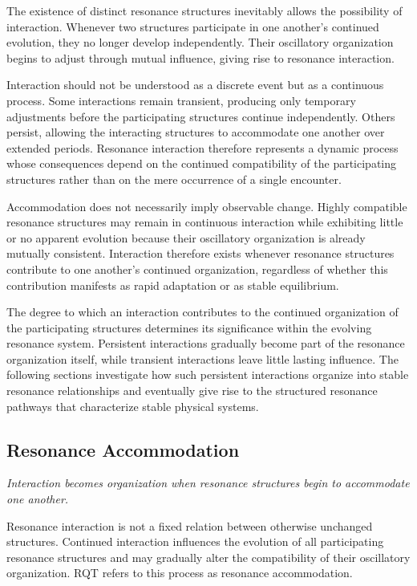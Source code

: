 \documentclass[11pt,a4paper]{article}
\begin{document}
The existence of distinct resonance structures inevitably allows the possibility of interaction. Whenever two structures participate in one another’s continued evolution, they no longer develop independently. Their oscillatory organization begins to adjust through mutual influence, giving rise to resonance interaction.

Interaction should not be understood as a discrete event but as a continuous process. Some interactions remain transient, producing only temporary adjustments before the participating structures continue independently. Others persist, allowing the interacting structures to accommodate one another over extended periods. Resonance interaction therefore represents a dynamic process whose consequences depend on the continued compatibility of the participating structures rather than on the mere occurrence of a single encounter.

Accommodation does not necessarily imply observable change. Highly compatible resonance structures may remain in continuous interaction while exhibiting little or no apparent evolution because their oscillatory organization is already mutually consistent. Interaction therefore exists whenever resonance structures contribute to one another’s continued organization, regardless of whether this contribution manifests as rapid adaptation or as stable equilibrium.

The degree to which an interaction contributes to the continued organization of the participating structures determines its significance within the evolving resonance system. Persistent interactions gradually become part of the resonance organization itself, while transient interactions leave little lasting influence. The following sections investigate how such persistent interactions organize into stable resonance relationships and eventually give rise to the structured resonance pathways that characterize stable physical systems.


\subsection{Resonance Accommodation}

\emph{Interaction becomes organization when resonance structures begin to accommodate one another.}
\vspace{0.6em} 

Resonance interaction is not a fixed relation between otherwise unchanged structures. Continued interaction influences the evolution of all participating resonance structures and may gradually alter the compatibility of their oscillatory organization. RQT refers to this process as resonance accommodation.
\end{document}
